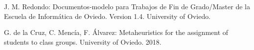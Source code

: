 \renewcommand{\documentname}{Bibliography}

\begin{thebibliography}{8}

        J. M. Redondo: Documentos-modelo para Trabajos de Fin de Grado/Master de la Escuela de Informática de Oviedo. Version 1.4. University of Oviedo.

        G. de la Cruz, C. Mencía, F. Álvarez: Metaheuristics for the assignment of students to class groups. University of Oviedo. 2018.

\end{thebibliography}

